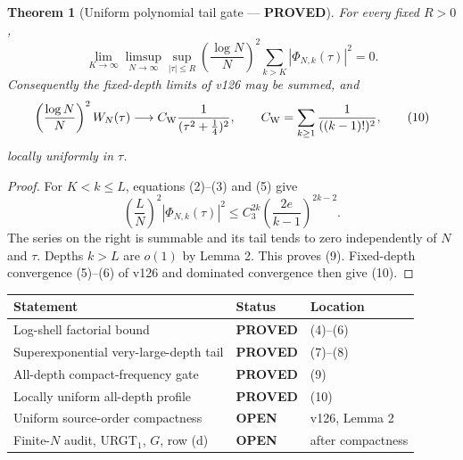 \documentclass[11pt]{article}
\newcommand{\PROVED}{\textcolor{green!40!black}{\textbf{PROVED}}}
\newcommand{\OPEN}{\textcolor{red!70!black}{\textbf{OPEN}}}
\newtheorem{theorem}{Theorem}
\begin{document}
\begin{theorem}[Uniform polynomial tail gate --- \PROVED]
For every fixed $R>0$,
\begin{equation}
 \boxed{
 \lim_{K\to\infty}\limsup_{N\to\infty}
 \sup_{|\tau|\le R}
 \left(\frac{\log N}{N}\right)^2
 \sum_{k>K}|\Phi_{N,k}(\tau)|^2=0.}                       \tag{9}
\end{equation}
Consequently the fixed-depth limits of v126 may be summed, and
\begin{equation}
 \left(\frac{\log N}{N}\right)^2W_N(\tau)
 \longrightarrow
 C_{\rm W}\frac1{(\tau^2+\frac14)^2},
 \qquad
 C_{\rm W}=\sum_{k\ge1}\frac1{((k-1)!)^2},               \tag{10}
\end{equation}
locally uniformly in $\tau$.
\end{theorem}

\begin{proof}
For $K<k\le L$, equations (2)--(3) and (5) give
\begin{equation}
 \left(\frac L N\right)^2|\Phi_{N,k}(\tau)|^2
 \le C_3^{2k}
 \left(\frac{2e}{k-1}\right)^{2k-2}.                     \tag{11}
\end{equation}
The series on the right is summable and its tail tends to zero independently
of $N$ and $\tau$.  Depths $k>L$ are $o(1)$ by Lemma 2.  This proves (9).
Fixed-depth convergence (5)--(6) of v126 and dominated convergence then
give (10).
\end{proof}

\begin{center}
\begin{tabular}{>{\raggedright\arraybackslash}p{.58\linewidth}
                >{\centering\arraybackslash}p{.14\linewidth}
                >{\raggedright\arraybackslash}p{.18\linewidth}}
\toprule
Statement & Status & Location \\
\midrule
Log-shell factorial bound & \PROVED & (4)--(6) \\
Superexponential very-large-depth tail & \PROVED & (7)--(8) \\
All-depth compact-frequency gate & \PROVED & (9) \\
Locally uniform all-depth profile & \PROVED & (10) \\
Uniform source-order compactness & \OPEN & v126, Lemma 2 \\
Finite-$N$ audit, URGT$_1$, $G$, row (d) & \OPEN & after compactness \\
\bottomrule
\end{tabular}
\end{center}
\end{document}

